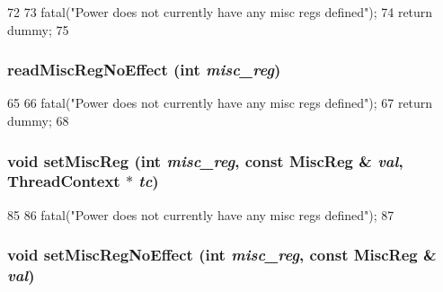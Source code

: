 \begin{DoxyCode}
72     {
73         fatal("Power does not currently have any misc regs defined\n");
74         return dummy;
75     }
\end{DoxyCode}
\hypertarget{classPowerISA_1_1ISA_a7b5ac6af9c2c19d7c1b442b8a3aebbc6}{
\subsubsection[{readMiscRegNoEffect}]{ readMiscRegNoEffect (int {\em misc\_\-reg})}}
\label{classPowerISA_1_1ISA_a7b5ac6af9c2c19d7c1b442b8a3aebbc6}



\begin{DoxyCode}
65     {
66         fatal("Power does not currently have any misc regs defined\n");
67         return dummy;
68     }
\end{DoxyCode}
\hypertarget{classPowerISA_1_1ISA_ae4d63c6d4ee4354d39674ff8c53d9e2f}{
\subsubsection[{setMiscReg}]{\setlength{\rightskip}{0pt plus 5cm}void setMiscReg (int {\em misc\_\-reg}, \/  const {\bf MiscReg} \& {\em val}, \/  {\bf ThreadContext} $\ast$ {\em tc})}}
\label{classPowerISA_1_1ISA_ae4d63c6d4ee4354d39674ff8c53d9e2f}



\begin{DoxyCode}
85     {
86         fatal("Power does not currently have any misc regs defined\n");
87     }
\end{DoxyCode}
\hypertarget{classPowerISA_1_1ISA_a763517aaea2f3decbc1ef9d064216b6f}{
\subsubsection[{setMiscRegNoEffect}]{\setlength{\rightskip}{0pt plus 5cm}void setMiscRegNoEffect (int {\em misc\_\-reg}, \/  const {\bf MiscReg} \& {\em val})}}
\label{classPowerISA_1_1ISA_a763517aaea2f3decbc1ef9d064216b6f}



